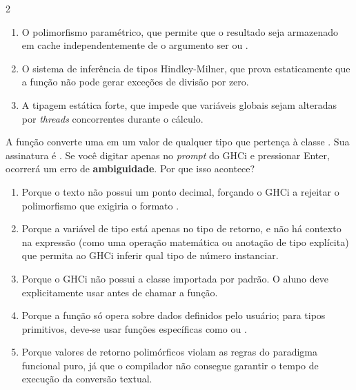 \documentclass[a4paper,10pt,brazil]{article}
\begin{document}
\begin{multicols}{2}
\begin{enumerate}
  \item O polimorfismo paramétrico, que permite que o resultado seja armazenado em cache independentemente de o argumento ser  ou .

  \item O sistema de inferência de tipos Hindley-Milner, que prova estaticamente que a função não pode gerar exceções de divisão por zero.

  \item A tipagem estática forte, que impede que variáveis globais sejam alteradas por \textit{threads} concorrentes durante o cálculo.


\end{enumerate}

A função  converte uma  em um valor de qualquer tipo que pertença à classe . Sua assinatura é . 
Se você digitar apenas  no \emph{prompt} do GHCi e pressionar Enter, ocorrerá um erro de \textbf{ambiguidade}. Por que isso acontece?

\begin{enumerate}
  \item Porque o texto  não possui um ponto decimal, forçando o GHCi a rejeitar o polimorfismo que exigiria o formato .

  \item Porque a variável de tipo  está apenas no tipo de retorno, e não há contexto na expressão (como uma operação matemática ou anotação de tipo explícita) que permita ao GHCi inferir qual tipo de número instanciar.

  \item Porque o GHCi não possui a classe  importada por padrão. O aluno deve explicitamente usar  antes de chamar a função.

  \item Porque a função  só opera sobre dados definidos pelo usuário; para tipos primitivos, deve-se usar funções específicas como  ou .

  \item Porque valores de retorno polimórficos violam as regras do paradigma funcional puro, já que o compilador não consegue garantir o tempo de execução da conversão textual.



\end{enumerate}
\end{multicols}
\end{document}
